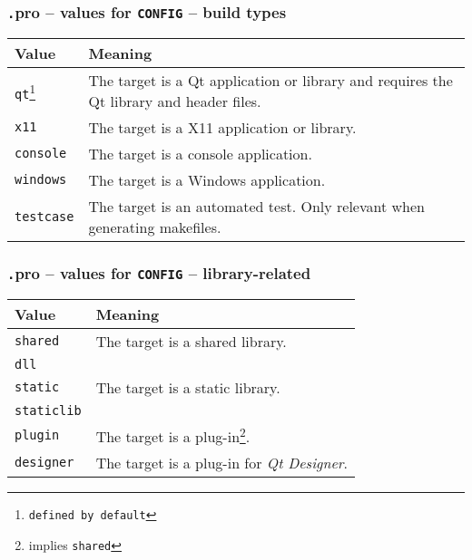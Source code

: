 \begin{frame}
\frametitle{{\texttt .pro} -- values for \texttt{CONFIG} -- build types}
  \begin{center}
  \begin{tabular}{|p{}|p{}|}
    \hline
    \textbf{Value} & \textbf{Meaning} \\
    \hline
    \texttt{qt\footnote{defined by default}} & The target is a Qt application
    or library and requires the Qt library and header files.\\
    \hline
    \texttt{x11} & The target is a X11 application or library.\\
    \hline
    \texttt{console} & The target is a console application. \\
    \hline
    \texttt{windows} & The target is a Windows application. \\
    \hline
    \texttt{testcase} & The target is an automated test. Only relevant when
    generating makefiles. \\
    \hline
  \end{tabular}
  \end{center}
\end{frame}

\begin{frame}
\frametitle{{\texttt .pro} -- values for \texttt{CONFIG} -- library-related}
  \begin{center}
  \begin{tabular}{|p{}|p{}|}
    \hline
    \textbf{Value} & \textbf{Meaning} \\
    \hline
    \texttt{shared} & The target is a shared library.\\
    \texttt{dll} & \\
    \hline
    \texttt{static} & The target is a static library.\\
    \texttt{staticlib} & \\
    \hline
    \texttt{plugin} & The target is a plug-in\footnote{implies \texttt{shared}}.\\
    \hline
    \texttt{designer} & The target is a plug-in for {\em Qt Designer}.\\
    \hline
  \end{tabular}
  \end{center}
\end{frame}

